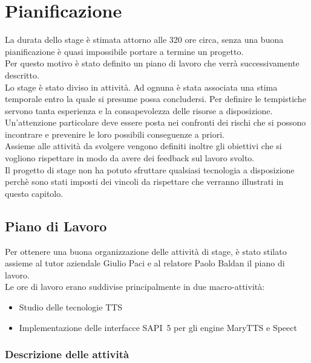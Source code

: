 \chapter{Pianificazione} %
La durata dello stage è stimata attorno alle 320 ore circa, senza una buona pianificazione è quasi impossibile portare a termine un progetto.\\
Per questo motivo è stato definito un piano di lavoro che verrà successivamente descritto.\\
Lo stage è stato diviso in attività. 
Ad ognuna è stata associata una stima temporale entro la quale si presume possa concludersi. Per definire le tempistiche servono tanta esperienza e la consapevolezza delle risorse a disposizione.\\
Un'attenzione particolare deve essere posta nei confronti dei rischi che si possono incontrare e prevenire le loro possibili conseguenze a priori.\\
Assieme alle attività da svolgere vengono definiti inoltre gli obiettivi che si vogliono rispettare in modo da avere dei feedback sul lavoro svolto.\\
Il progetto di stage non ha potuto sfruttare qualsiasi tecnologia a disposizione perchè sono stati imposti dei vincoli da rispettare che verranno illustrati in questo capitolo. 

\thispagestyle{empty}

\newpage
\section{Piano di Lavoro}
Per ottenere una buona organizzazione delle attività di stage, è stato stilato assieme al tutor aziendale Giulio Paci e al relatore Paolo Baldan il piano di lavoro.\\
Le ore di lavoro erano suddivise principalmente in due macro-attività:
\begin{itemize}
	\item Studio delle tecnologie TTS
	\item Implementazione delle interfacce SAPI~5 per gli engine MaryTTS e Speect
\end{itemize}

\subsection{Descrizione delle attività}

